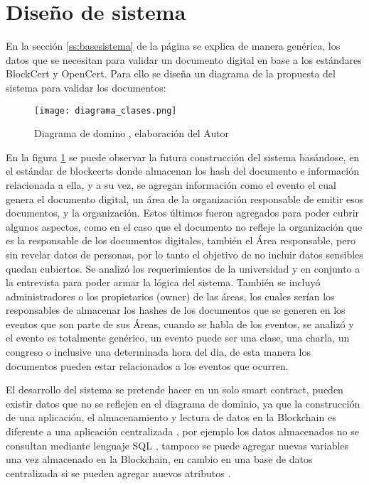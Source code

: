 \section{Diseño de sistema}\label{s:system_design}
En la sección \ref{ss:basesistema} de la  página \pageref{ss:basesistema} se explica de manera genérica, los datos que se necesitan 
para validar un documento digital en base a los estándares BlockCert y OpenCert.
Para ello se diseña un diagrama de la propuesta del sistema para validar los documentos:  

\begin{figure}[hbt!]
    \centering
    {\texttt{[image: diagrama\_clases.png]}}
    \caption{Diagrama de domino , elaboración del Autor}
    \label{img:diagrama_clases}
  \end{figure}

  En la figura \ref{img:diagrama_clases} se puede observar la futura  construcción del sistema basándose, 
  en el estándar de blockcerts donde almacenan los hash del documento e información relacionada a ella, y a su vez,
  se agregan información como el evento el cual genera el documento digital,  un área de la organización responsable 
  de emitir esos documentos, y la organización. 
  Estos últimos fueron agregados para poder cubrir algunos aspectos, como en el caso que el documento no refleje la organización que es la responsable de 
  los documentos digitales, también el Área responsable, pero sin revelar datos de personas, por lo tanto el objetivo
  de no incluir  datos sensibles quedan cubiertos. Se analizó
  los requerimientos de la universidad y en conjunto a la entrevista para poder armar la lógica del sistema. También se incluyó administradores o los propietarios (owner) 
  de las áreas, los cuales serían los responsables de almacenar los hashes de los documentos que se generen en los eventos que son parte de sus Áreas,
  cuando se habla de los eventos, se analizó y el evento es totalmente genérico, un evento puede ser una clase, una charla, un congreso o inclusive
  una determinada hora del dia, de esta manera los documentos pueden estar relacionados a los eventos que ocurren.

  El desarrollo del sistema se pretende hacer en un solo smart contract, pueden existir datos que no se reflejen en el diagrama de dominio, 
  ya que la construcción de una aplicación, el almacenamiento y lectura de datos en la  Blockchain es diferente a una 
  aplicación centralizada , por ejemplo los datos almacenados no se consultan mediante lenguaje SQL \cite[]{mayor_Blockchain_2017}, tampoco se puede agregar nuevas
  variables una vez almacenado en la Blockchain, en cambio en una base de datos centralizada si se pueden agregar nuevos atributos \cite[]{dannen_introducing_2017}.


